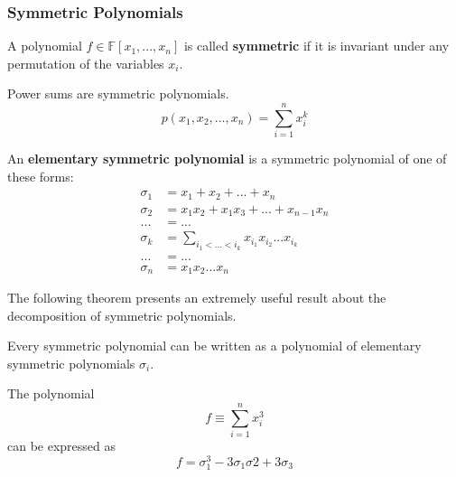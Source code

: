 \documentclass{article}
\begin{document}
    \subsubsection{Symmetric Polynomials}

      \begin{definition}
        A polynomial $f \in \mathbb{F}[x_1, ..., x_n]$ is called \textbf{symmetric} if it is invariant under any permutation of the variables $x_i$. 
      \end{definition}

      \begin{example}
        Power sums are symmetric polynomials. 
        \begin{equation}
          p(x_1, x_2, ..., x_n) = \sum_{i=1}^n x_i^k
        \end{equation}
      \end{example}

      \begin{definition}
        An \textbf{elementary symmetric polynomial} is a symmetric polynomial of one of these forms: 
        \begin{align*}
          \sigma_1 & = x_1 + x_2 + ... + x_n \\
          \sigma_2 & = x_1 x_2 + x_1 x_3 + ... + x_{n-1} x_n \\
          ... & = ... \\
          \sigma_k & = \sum_{i_1 < ... < i_k} x_{i_1} x_{i_2} ... x_{i_k} \\
          ... & = ... \\
          \sigma_n & = x_1 x_2 ... x_n
        \end{align*}
      \end{definition}

      The following theorem presents an extremely useful result about the decomposition of symmetric polynomials. 

      \begin{theorem}
        Every symmetric polynomial can be written as a polynomial of elementary symmetric polynomials $\sigma_i$. 
      \end{theorem}

      \begin{example}
        The polynomial 
        \begin{equation}
          f \equiv \sum_{i=1}^n x_i^3
        \end{equation}
        can be expressed as 
        \begin{equation}
          f = \sigma_1^3 - 3 \sigma_1 \sigma 2 + 3 \sigma_3
        \end{equation}
      \end{example}
\end{document}

